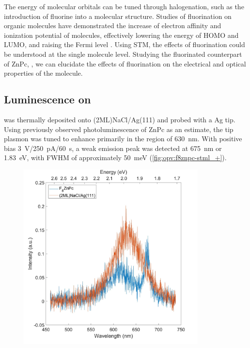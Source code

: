 The energy of molecular orbitals can be tuned through halogenation, such as the introduction of fluorine into a molecular structure. Studies of fluorination on organic molecules have demonstrated the increase of electron affinity and ionization potential of molecules, effectively lowering the energy of HOMO and LUMO, and raising the Fermi level \citep{schwarze2016band,warren2019controlling}. Using \ac{STM}, the effects of fluorination could be understood at the single molecule level. Studying the fluorinated counterpart of ZnPc, , we can elucidate the effects of fluorination on the electrical and optical properties of the molecule.


\subsection{Luminescence on }

 was thermally deposited onto (2ML)NaCl/Ag(111) and probed with a Ag tip. Using previously observed photoluminescence of ZnPc as an estimate, the tip plasmon was tuned to enhance primarily in the region of \SI{630}{nm}. With positive bias \SI{3}{V}/\SI{250}{pA}/\SI{60}{s}, a weak emission peak was detected at \SI{675}{nm} or \SI{1.83}{eV}, with FWHM of approximately \SI{50}{meV} (\autoref{fig:opv:f8znpc-stml_+}).

\begin{figure} [h]
    \centering
        \includegraphics[width=0.85\textwidth]{pictures/f8znpc_3V_250pA_60s.jpg}
    \caption{}
    \label{fig:opv:f8znpc-stml_+}
\end{figure}


